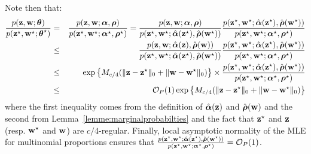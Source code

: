 \proofbegin
Note then that:
\begin{align*}
\frac{\prob(\bz, \bw; \btheta)}{\prob(\bzs, \bws; \bthetas)} & = & \frac{\prob(\bz, \bw; \bpi, \brho)}{\prob(\bzs, \bws; \bpis, \brhos)} = 
\frac{\prob(\bz, \bw; \bpi, \brho)}{\prob(\bzs, \bws; \hat{\bpi}(\bzs), \hat{\brho}(\bws))} \frac{\prob(\bzs, \bws; \hat{\bpi}(\bzs), \hat{\brho}(\bws))}{\prob(\bzs, \bws; \bpis, \brhos)} \\
& \leq & \frac{\prob(\bz, \bw; \hat{\bpi}(\bz), \hat{\brho}(\bw))}{\prob(\bzs, \bws; \hat{\bpi}(\bzs), \hat{\brho}(\bws))} \frac{\prob(\bzs, \bws; \hat{\bpi}(\bzs), \hat{\brho}(\bws))}{\prob(\bzs, \bws; \bpis, \brhos)} \\
& \leq & \exp \left\{ M_{c/4} ( \|\bz - \bzs \|_0 + \|\bw - \bws \|_0 ) \right\} \times \frac{\prob(\bzs, \bws; \hat{\bpi}(\bzs), \hat{\brho}(\bws))}{\prob(\bzs, \bws; \bpis, \brhos)} \\
& \leq & \bigO_P(1) \exp \left\{ M_{c/4} ( \|\bz - \bzs \|_0 + \|\bw - \bws \|_0 ) \right\}  \\
\end{align*}
where the first inequality comes from the definition of $\hat{\boldsymbol{\alpha}}(\mathbf{z})$ and $\hat{\boldsymbol{\rho}}(\mathbf{w})$ and the second from Lemma~\ref{lemme:marginalprobabilties} and the fact that $\mathbf{z}^\star$ and $\mathbf{z}$ (resp. $\mathbf{w}^\star$ and $\mathbf{w}$) are $c/4$-regular. 
Finally, local asymptotic normality of the MLE for multinomial proportions ensures that $\frac{p(\mathbf{z}^\star, \mathbf{w}^\star; \hat{\boldsymbol{\alpha}}(\mathbf{z}^\star), \hat{\boldsymbol{\rho}}(\mathbf{w}^\star))}{p(\mathbf{z}^\star, \mathbf{w}^\star; \boldsymbol{\alpha}^\star, \boldsymbol{\rho}^\star)} = \mathcal{O}_P(1)$. 
\proofend



